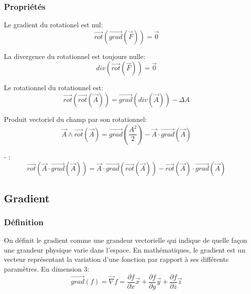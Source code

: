 \documentclass[10pt,a4paper]{article}
\begin{document}
\subsubsection{Propriétés}
Le gradient du rotationel est nul:
\begin{equation}
\overrightarrow{rot}(\overrightarrow{grad}(\overrightarrow{F})) = \overrightarrow{0}
\label{rotgrad}
\end{equation}

La divergence du rotationnel est toujours nulle:
\begin{equation}
div(\overrightarrow{rot}(\overrightarrow{F})) = \overrightarrow{0}
\end{equation}

Le rotationnel du rotationnel est:
\begin{equation}
\overrightarrow{rot}(\overrightarrow{rot}(\overrightarrow{A})) = \overrightarrow{grad}(div(\overrightarrow{A})) - \Delta A
\end{equation}

Produit vectoriel du champ par son rotationnel:
\begin{equation}
\overrightarrow{A} \land \overrightarrow{rot}(\overrightarrow{A}) = \overrightarrow{grad}(\frac{A^{2}}{2})  - \overrightarrow{A}\cdot\overrightarrow{grad}(\overrightarrow{A})
\label{vectrotvect}
\end{equation}

- :
\begin{equation}
\overrightarrow{rot}(\overrightarrow{A}\cdot\overrightarrow{grad}(\overrightarrow{A})) = \overrightarrow{A}\cdot\overrightarrow{grad}(\overrightarrow{rot}(\overrightarrow{A})) - \overrightarrow{rot}(\overrightarrow{A})\cdot\overrightarrow{grad}(\overrightarrow{A})
\end{equation}


\subsection{Gradient \cite{gradient}}
\subsubsection{Définition}
On définit le gradient comme une grandeur vectorielle qui indique de quelle façon une grandeur physique varie dans l'espace. En mathématiques, le gradient est un vecteur représentant la variation d'une fonction par rapport à ses différents paramètres. En dimension 3:
\begin{equation}
\overrightarrow{grad}(f) = \overrightarrow{\nabla} f = \frac{\partial f}{\partial x}\overrightarrow{x} + \frac{\partial f}{\partial y}\overrightarrow{y} +\frac{\partial f}{\partial z}\overrightarrow{z}
\end{equation}
\end{document}
